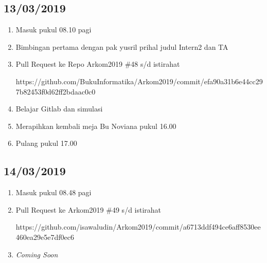 \subsection{13/03/2019}
\begin{enumerate}
  \item Masuk pukul 08.10 pagi
  \item Bimbingan pertama dengan pak yusril prihal judul Intern2 dan TA
  \item Pull Request ke Repo Arkom2019 \#48 s/d istirahat
\par https://github.com/BukuInformatika/Arkom2019/commit/efa90a31b6e44cc297b82453f0d62ff2bdaac0c0
  \item Belajar Gitlab dan simulasi
  \item Merapihkan kembali meja Bu Noviana pukul 16.00
  \item Pulang pukul 17.00
\end{enumerate}

\subsection{14/03/2019}
\begin{enumerate}
  \item Masuk pukul 08.48 pagi
  \item Pull Request ke Arkom2019 \#49  s/d istirahat
\par https://github.com/isawaludin/Arkom2019/commit/a6713ddf494ce6aff8530ee460ea29e5e7df0ec6
  \item \textit{Coming Soon}
\end{enumerate}

